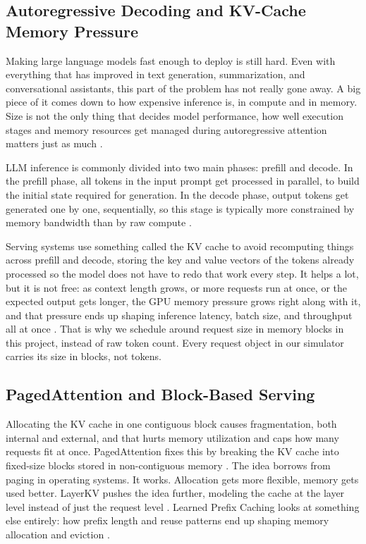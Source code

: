 \subsection{Autoregressive Decoding and KV-Cache Memory Pressure}
Making large language models fast enough to deploy is still hard. Even with everything that has improved in text generation, summarization, and conversational assistants, this part of the problem has not really gone away. A big piece of it comes down to how expensive inference is, in compute and in memory. Size is not the only thing that decides model performance, how well execution stages and memory resources get managed during autoregressive attention matters just as much \cite{agrawal2023sarathi}.

LLM inference is commonly divided into two main phases: prefill and decode. In the prefill phase, all tokens in the input prompt get processed in parallel, to build the initial state required for generation. In the decode phase, output tokens get generated one by one, sequentially, so this stage is typically more constrained by memory bandwidth than by raw compute \cite{agrawal2023sarathi}.

Serving systems use something called the KV cache to avoid recomputing things across prefill and decode, storing the key and value vectors of the tokens already processed so the model does not have to redo that work every step. It helps a lot, but it is not free: as context length grows, or more requests run at once, or the expected output gets longer, the GPU memory pressure grows right along with it, and that pressure ends up shaping inference latency, batch size, and throughput all at once \cite{kwon2023pagedattention}. That is why we schedule around request size in memory blocks in this project, instead of raw token count. Every request object in our simulator carries its size in blocks, not tokens.

\subsection{PagedAttention and Block-Based Serving}
Allocating the KV cache in one contiguous block causes fragmentation, both internal and external, and that hurts memory utilization and caps how many requests fit at once. PagedAttention fixes this by breaking the KV cache into fixed-size blocks stored in non-contiguous memory \cite{kwon2023pagedattention}. The idea borrows from paging in operating systems. It works. Allocation gets more flexible, memory gets used better. LayerKV pushes the idea further, modeling the cache at the layer level instead of just the request level \cite{xiong2024layerkv}. Learned Prefix Caching looks at something else entirely: how prefix length and reuse patterns end up shaping memory allocation and eviction \cite{yang2024prefixcache}.

